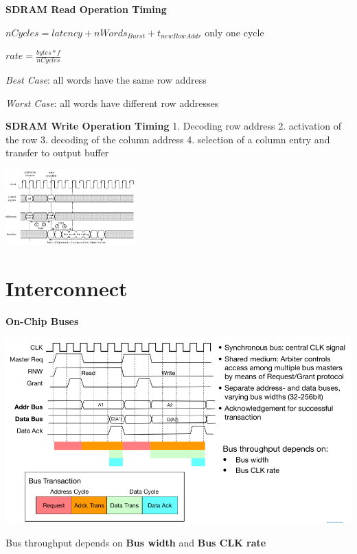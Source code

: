 \documentclass[english]{latex4ei/latex4ei_sheet}
\begin{document}
\textbf{SDRAM Read Operation Timing}

$nCycles = latency + nWords_{Burst} + t_{newRowAddr}$ \quad only one cycle

$rate = \frac{bytes * f}{nCycles}$

\textit{Best Case}: all words have the same row address

\textit{Worst Case}: all words have different row addresses

\textbf{SDRAM Write Operation Timing}
1. Decoding row address 2. activation of the row 3. decoding of the column address 4. selection of a column entry and transfer to output buffer
\begin{center}
    \includegraphics[width=5cm]{images//5.Memory/SDRAMWrite.png}
\end{center}

\section{Interconnect}

\textbf{On-Chip Buses}
\begin{center}
    \includegraphics[width=0.8\linewidth]{images//6.Interconnects/OnChipBasicOperation.png}
\end{center}
Bus throughput depends on \textbf{Bus width} and \textbf{Bus CLK rate}
\end{document}
